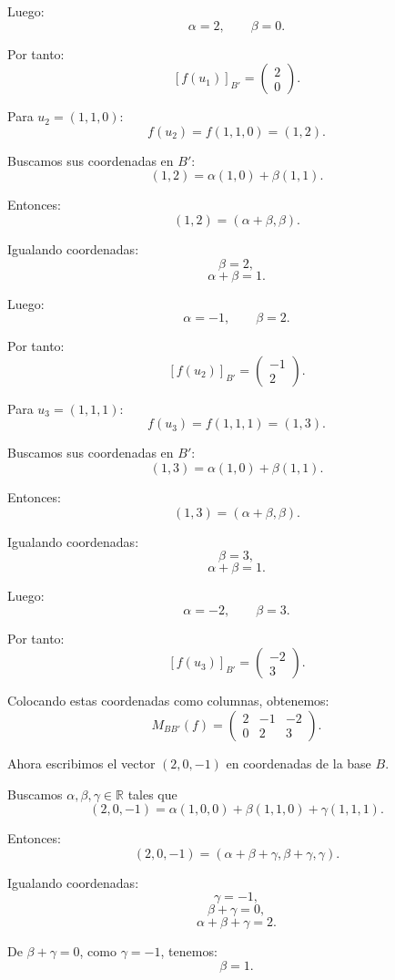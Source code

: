 \documentclass[12pt]{article}
\begin{document}
Luego:
\[
\alpha=2,
\qquad
\beta=0.
\]

Por tanto:
\[
[f(u_1)]_{B'}=
\begin{pmatrix}
2\\
0
\end{pmatrix}.
\]

Para \(u_2=(1,1,0)\):
\[
f(u_2)=f(1,1,0)=(1,2).
\]

Buscamos sus coordenadas en \(B'\):
\[
(1,2)=\alpha(1,0)+\beta(1,1).
\]

Entonces:
\[
(1,2)=(\alpha+\beta,\beta).
\]

Igualando coordenadas:
\[
\beta=2,
\]
\[
\alpha+\beta=1.
\]

Luego:
\[
\alpha=-1,
\qquad
\beta=2.
\]

Por tanto:
\[
[f(u_2)]_{B'}=
\begin{pmatrix}
-1\\
2
\end{pmatrix}.
\]

Para \(u_3=(1,1,1)\):
\[
f(u_3)=f(1,1,1)=(1,3).
\]

Buscamos sus coordenadas en \(B'\):
\[
(1,3)=\alpha(1,0)+\beta(1,1).
\]

Entonces:
\[
(1,3)=(\alpha+\beta,\beta).
\]

Igualando coordenadas:
\[
\beta=3,
\]
\[
\alpha+\beta=1.
\]

Luego:
\[
\alpha=-2,
\qquad
\beta=3.
\]

Por tanto:
\[
[f(u_3)]_{B'}=
\begin{pmatrix}
-2\\
3
\end{pmatrix}.
\]

Colocando estas coordenadas como columnas, obtenemos:
\[
M_{BB'}(f)=
\begin{pmatrix}
2&-1&-2\\
0&2&3
\end{pmatrix}.
\]

Ahora escribimos el vector \((2,0,-1)\) en coordenadas de la base \(B\).

Buscamos \(\alpha,\beta,\gamma\in\mathbb{R}\) tales que
\[
(2,0,-1)=\alpha(1,0,0)+\beta(1,1,0)+\gamma(1,1,1).
\]

Entonces:
\[
(2,0,-1)=(\alpha+\beta+\gamma,\beta+\gamma,\gamma).
\]

Igualando coordenadas:
\[
\gamma=-1,
\]
\[
\beta+\gamma=0,
\]
\[
\alpha+\beta+\gamma=2.
\]

De \(\beta+\gamma=0\), como \(\gamma=-1\), tenemos:
\[
\beta=1.
\]
\end{document}
